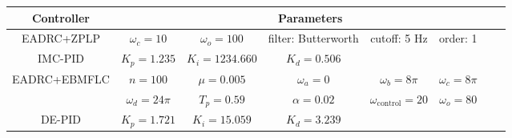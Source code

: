 \begin{tabular}{
    c |
    c c c c c c c
}
    Controller &
    \multicolumn{7}{c}{Parameters}  \\
    \hline
    EADRC+ZPLP & 
        $\omega_c=10$ & 
        $\omega_o=100$  &  
        filter: Butterworth &
        cutoff: 5 Hz &
        order: 1 & & \\
    \hline
    IMC-PID & 
        $K_p=1.235$ & 
        $K_i=1234.660$ & 
        $K_d=0.506$ &
        & & & \\
    \hline
    \multirow{2}{*}{EADRC+EBMFLC} & 
        $n=100$ & 
        $\mu=0.005$ & 
        $\omega_a=0$ & 
        $\omega_b=8\pi$ & 
        $\omega_c=8\pi$ \\ 
    &
        $\omega_d=24\pi$ & 
        $T_p=0.59$ &
        $\alpha=0.02$ &
        $\omega_\text{control}=20$ &
        $\omega_o=80$ &
        \\
    \hline
    DE-PID &
        $K_p = 1.721$ & 
        $K_i = 15.059$ & 
        $K_d = 3.239$ 
    \\
\end{tabular}